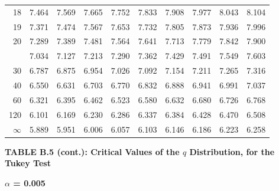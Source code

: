 \documentclass[10pt]{article}
\begin{document}
\begin{longtable}{@{}r!{\vrule width 0.8pt\hspace{0.55em}}rrrrrrrrr@{}}
18 & 7.464 & 7.569 & 7.665 & 7.752 & 7.833 & 7.908 & 7.977 & 8.043 & 8.104 \\
19 & 7.371 & 7.474 & 7.567 & 7.653 & 7.732 & 7.805 & 7.873 & 7.936 & 7.996 \\
20 & 7.289 & 7.389 & 7.481 & 7.564 & 7.641 & 7.713 & 7.779 & 7.842 & 7.900 \\
 & 7.034 & 7.127 & 7.213 & 7.290 & 7.362 & 7.429 & 7.491 & 7.549 & 7.603 \\
30 & 6.787 & 6.875 & 6.954 & 7.026 & 7.092 & 7.154 & 7.211 & 7.265 & 7.316 \\
40 & 6.550 & 6.631 & 6.703 & 6.770 & 6.832 & 6.888 & 6.941 & 6.991 & 7.037 \\
60 & 6.321 & 6.395 & 6.462 & 6.523 & 6.580 & 6.632 & 6.680 & 6.726 & 6.768 \\
120 & 6.101 & 6.169 & 6.230 & 6.286 & 6.337 & 6.384 & 6.428 & 6.470 & 6.508 \\
\addlinespace[0.30em]
$\infty$ & 5.889 & 5.951 & 6.006 & 6.057 & 6.103 & 6.146 & 6.186 & 6.223 & 6.258 \\
\end{longtable}
\newpage
\thispagestyle{empty}
\begin{center}
{\large\bfseries TABLE B.5 (cont.): Critical Values of the $q$ Distribution, for the Tukey Test\par}
\end{center}
{\large\bfseries $\alpha$ = 0.005\par}
\vspace{0.45em}
\small
\end{document}
